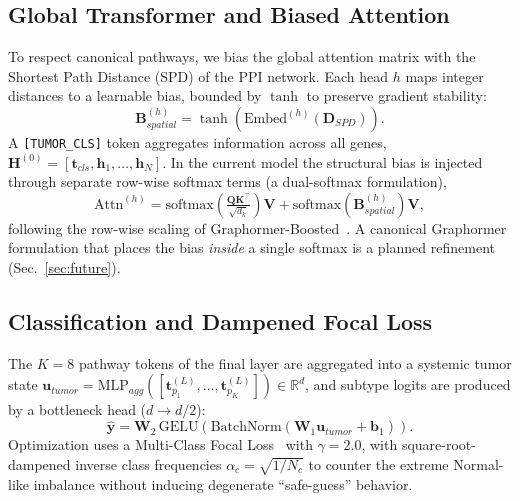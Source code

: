 \documentclass[10pt, twocolumn]{article}
\begin{document}
\subsection{Global Transformer and Biased Attention}
\label{sec:globalattn}
To respect canonical pathways, we bias the global attention matrix with the
Shortest Path Distance (SPD) of the PPI network. Each head $h$ maps integer
distances to a learnable bias, bounded by $\tanh$ to preserve gradient stability:
\begin{equation}
    \mathbf{B}_{spatial}^{(h)} = \tanh\!\left(\text{Embed}^{(h)}(\mathbf{D}_{SPD})\right).
\end{equation}
A \texttt{[TUMOR\_CLS]} token aggregates information across all genes,
$\mathbf{H}^{(0)} = [\mathbf{t}_{cls}, \mathbf{h}_1, \dots, \mathbf{h}_N]$. In the
current model the structural bias is injected through separate row-wise softmax
terms (a dual-softmax formulation),
\begin{equation}
    \text{Attn}^{(h)} = \text{softmax}\!\left(\tfrac{\mathbf{Q}\mathbf{K}^\top}
    {\sqrt{d_k}}\right)\mathbf{V} + \text{softmax}\!\left(\mathbf{B}_{spatial}^{(h)}
    \right)\mathbf{V},
\end{equation}
following the row-wise scaling of Graphormer-Boosted~\cite{fadlallah2025}. A
canonical Graphormer formulation that places the bias \emph{inside} a single
softmax is a planned refinement (Sec.~\ref{sec:future}).

\subsection{Classification and Dampened Focal Loss}
The $K=8$ pathway tokens of the final layer are aggregated into a systemic tumor
state $\mathbf{u}_{tumor} = \text{MLP}_{agg}([\mathbf{t}_{p_1}^{(L)}, \dots,
\mathbf{t}_{p_K}^{(L)}]) \in \mathbb{R}^d$, and subtype logits are produced by a
bottleneck head ($d \to d/2$):
\begin{equation}
    \hat{\mathbf{y}} = \mathbf{W}_2\,\text{GELU}\!\left(\text{BatchNorm}
    (\mathbf{W}_1 \mathbf{u}_{tumor} + \mathbf{b}_1)\right).
\end{equation}
Optimization uses a Multi-Class Focal Loss~\cite{lin2017focal} with
$\gamma=2.0$, with square-root-dampened inverse class frequencies
$\alpha_c = \sqrt{1/N_c}$ to counter the extreme Normal-like imbalance without
inducing degenerate ``safe-guess'' behavior.

\end{document}
